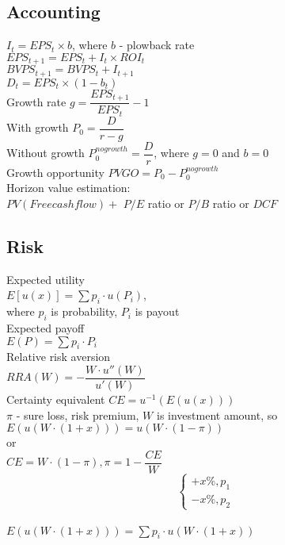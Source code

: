 \subsection*{Accounting}
$I_t = EPS_t\times b$, where $b$ - plowback rate\\
$EPS_{t+1} = EPS_t+I_t\times ROI_t$ \\
$BVPS_{t+1}=BVPS_t + I_{t+1}$ \\
$D_t=EPS_t\times (1-b_t)$ \\

Growth rate $g = \dfrac{EPS_{t+1}}{EPS_t} - 1$ \\
With growth $P_0 = \dfrac{D}{r-g}$\\
Without growth $P^{nogrowth}_0 = \dfrac{D}{r}$, where $g = 0$ and $b = 0$ \\
Growth opportunity $PVGO = P_0 - P^{nogrowth}_0$\\
Horizon value estimation: \\
$PV(Free cash flow) +$ $P/E$ ratio or $P/B$ ratio or $DCF$
\subsection*{Risk}
Expected utility \\
$E[u(x)] = \sum p_i\cdot u(P_i)$, \\ where $p_i$ is probability, $P_i$ is payout \\
Expected payoff \\
$E(P) = \sum p_i\cdot P_i$ \\
Relative risk aversion \\
$RRA(W) = -\dfrac{W\cdot u''(W)}{u'(W)}$ \\
Certainty equivalent $CE = u^{-1} (E(u(x)))$ \\
$\pi$ - sure loss, risk premium, $W$ is investment amount, so \\
$E(u(W\cdot (1+x))) = u(W\cdot (1-\pi))$\\
or \\
$CE = W\cdot (1-\pi), \pi =1 - \dfrac{CE}{W}$ \\

$$
\begin{cases}
  +x\%, p_1 \\
  -x\%, p_2
\end{cases}
$$ \\
$E(u(W\cdot (1+x))) = \sum p_i \cdot u(W\cdot (1+x))$
